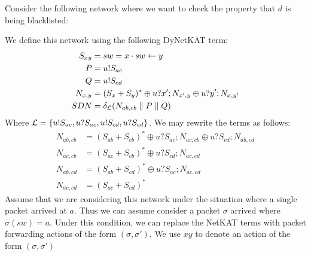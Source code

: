 \begin{example}
    Consider the following network where we want to check the property
    that $d$ is being blacklisted:
    \begin{center}
    \end{center}
    We define this network using the following DyNetKAT term:
    \begin{align*}
        S_{xy}  & = sw = x \cdot sw \leftarrow y            \\
        P       & = u!S_{ac}                         \\
        Q       & = u!S_{cd}                         \\
        N_{x,y} & = (S_x+S_y)^* \oplus u?x';N_{x',y}
        \oplus u?y';N_{x,y'}                         \\
        SDN     & = \delta_{\mathcal{L}} (N_{ab,cb}
        \parallel P \parallel Q)
    \end{align*}
    Where $\mathcal{L} = \{u!S_{ac},u?S_{ac},u!S_{cd},u?S_{cd}\}$.
    We may rewrite the terms as follows:
    \begin{align*}
        N_{ab,cb} & = (S_{ab} + S_{cb})^* \oplus u?S_{ac};N_{ac,cb}
        \oplus u?S_{cd};N_{ab,cd}                                   \\
        N_{ac,cb} & = (S_{ac}+S_{cb})^* \oplus u?S_{cd};N_{ac,cd}   \\
        N_{ab,cd} & = (S_{ab}+S_{cd})^* \oplus u?S_{ac};N_{ac,cd}   \\
        N_{ac,cd} & = (S_{ac}+S_{cd})^*
    \end{align*}
    Assume that we are considering this network under the situation where
    a single packet arrived at $a$.
    Thus we can assume consider a packet $\sigma$ arrived where
    $\sigma(sw) = a$.
    Under this condition, we can replace the NetKAT terms with
    packet forwarding actions of the form $(\sigma, \sigma')$.
    We use $xy$ to denote an action of the form $(\sigma,\sigma')$

\end{example}
